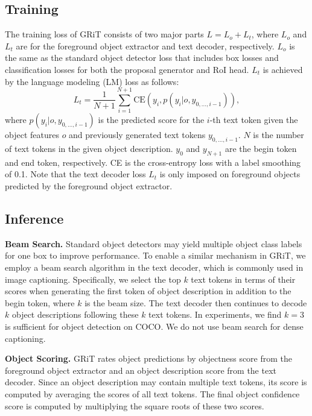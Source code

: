 \documentclass[10pt,twocolumn,letterpaper]{article}
\newcommand{\myparagraph}[1]{{\vspace{0.5em} \noindent \bf #1}}
\begin{document}
\subsection{Training} The training loss of GRiT consists of two major parts $L=L_{o}+L_{t}$, where $L_{o}$ and $L_{t}$ are for the foreground object extractor and text decoder, respectively. $L_{o}$ is the same as the standard object detector loss that includes box losses and classification losses for both the proposal generator and RoI head. $L_{t}$ is achieved by the language modeling (LM) loss as follows:
\begin{equation}
    L_{t} = \frac{1}{N+1}\sum_{i=1}^{N+1}\text{CE}(y_i, p(y_i|o,y_{0,...,i-1})),
\end{equation}
where $p(y_i|o,y_{0,...,i-1})$ is the predicted score for the $i$-th text token given the object features $o$ and previously generated text tokens $y_{0,...,i-1}$. $N$ is the number of text tokens in the given object description. $y_{0}$ and $y_{N+1}$ are the begin token and end token, respectively. CE is the cross-entropy loss with a label smoothing of 0.1. Note that the text decoder loss $L_{t}$ is only imposed on foreground objects predicted by the foreground object extractor.

\subsection{Inference}
\myparagraph{Beam Search.} Standard object detectors may yield multiple object class labels for one box to improve performance. To enable a similar mechanism in GRiT, we employ a beam search algorithm in the text decoder, which is commonly used in image captioning. Specifically, we select the top $k$ text tokens in terms of their scores when generating the first token of object description in addition to the begin token, where $k$ is the beam size. The text decoder then continues to decode $k$ object descriptions following these $k$ text tokens. In experiments, we find $k=3$ is sufficient for object detection on COCO. We do not use beam search for dense captioning.

\myparagraph{Object Scoring.} GRiT rates object predictions by objectness score from the foreground object extractor and an object description score from the text decoder. Since an object description may contain multiple text tokens, its score is computed by averaging the scores of all text tokens. The final object confidence score is computed by multiplying the square roots of these two scores.
\end{document}
